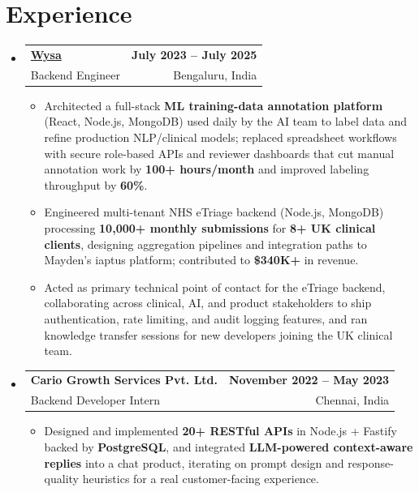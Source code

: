 \documentclass[letterpaper,10pt]{article}
\makeatletter
\newcommand{\resumeItem}[1]{
  \item\small{#1\vspace{-1pt}}
}
\newcommand{\resumeSubheading}[4]{
  \vspace{1pt}\item
    \begin{tabular*}{0.985\textwidth}[t]{l@{\extracolsep{\fill}}r}
      \textbf{#1} & \textbf{\small #2} \\
      {\small\color{ResumeSlate} #3} & {\small\color{ResumeSlate} #4} \\
    \end{tabular*}\vspace{-6pt}
}
\newcommand{\resumeSubHeadingListStart}{\begin{itemize}[leftmargin=0.0in, label={}, itemsep=2pt, topsep=2pt]}
\newcommand{\resumeSubHeadingListEnd}{\end{itemize}}
\newcommand{\resumeItemListStart}{\begin{itemize}[leftmargin=0.18in, itemsep=2pt, topsep=1pt]}
\newcommand{\resumeItemListEnd}{\end{itemize}\vspace{-4pt}}
\makeatother
\begin{document}
\section{Experience}
\resumeSubHeadingListStart
  \resumeSubheading
    {\href{https://www.wysa.io}{Wysa}}{July 2023 -- July 2025}
    {Backend Engineer}{Bengaluru, India}
    \resumeItemListStart
      \resumeItem{Architected a full-stack \textbf{ML training-data annotation platform} (React, Node.js, MongoDB) used daily by the AI team to label data and refine production NLP/clinical models; replaced spreadsheet workflows with secure role-based APIs and reviewer dashboards that cut manual annotation work by \textbf{100+ hours/month} and improved labeling throughput by \textbf{60\%}.}
      \resumeItem{Engineered multi-tenant NHS eTriage backend (Node.js, MongoDB) processing \textbf{10{,}000+ monthly submissions} for \textbf{8+ UK clinical clients}, designing aggregation pipelines and integration paths to Mayden's iaptus platform; contributed to \textbf{\$340K+} in revenue.}
      \resumeItem{Acted as primary technical point of contact for the eTriage backend, collaborating across clinical, AI, and product stakeholders to ship authentication, rate limiting, and audit logging features, and ran knowledge transfer sessions for new developers joining the UK clinical team.}
    \resumeItemListEnd
  \resumeSubheading
    {Cario Growth Services Pvt. Ltd.}{November 2022 -- May 2023}
    {Backend Developer Intern}{Chennai, India}
    \resumeItemListStart
      \resumeItem{Designed and implemented \textbf{20+ RESTful APIs} in Node.js + Fastify backed by \textbf{PostgreSQL}, and integrated \textbf{LLM-powered context-aware replies} into a chat product, iterating on prompt design and response-quality heuristics for a real customer-facing experience.}
    \resumeItemListEnd
\resumeSubHeadingListEnd
\vspace{-4pt}
\end{document}
